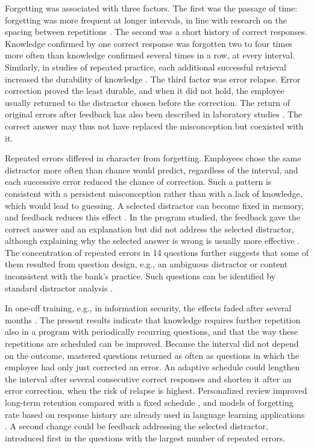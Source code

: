 \documentclass[preprint,12pt,authoryear]{elsarticle}
\begin{document}
Forgetting was associated with three factors. The first was the passage of time: forgetting was more
frequent at longer intervals, in line with research on the spacing between repetitions
\citep{cepeda2006}. The second was a short history of correct responses. Knowledge confirmed by one
correct response was forgotten two to four times more often than knowledge confirmed several times in
a row, at every interval.
Similarly, in studies of repeated practice, each additional successful retrieval increased the
durability of knowledge \citep{rawson2013}. The third factor was error relapse. Error correction proved
the least durable, and when it did not hold, the employee usually returned to the distractor chosen
before the correction. The return of original errors after feedback has also been described in
laboratory studies \citep{butler2011}. The correct answer may thus not have replaced the misconception
but coexisted with it.

Repeated errors differed in character from forgetting. Employees chose the same distractor more often
than chance would predict, regardless of the interval, and each successive error reduced the chance of
correction. Such a pattern is consistent with a persistent misconception rather than with a lack of
knowledge, which would lead to guessing. A selected distractor can become fixed in memory, and feedback
reduces this effect \citep{butler2008}. In the program studied, the feedback gave the correct answer
and an explanation but did not address the selected distractor, although explaining why the selected
answer is wrong is usually more effective \citep{shute2008}. The concentration of repeated errors in
14 questions further suggests that some of them resulted from question design, e.g.,
an ambiguous distractor or content inconsistent with the bank's practice. Such questions can be
identified by standard distractor analysis \citep{gierl2017}.

In one-off training, e.g., in information security, the effects faded after several months
\citep{reinheimer2020}. The present results indicate that knowledge requires further repetition also in
a program with periodically recurring questions, and that the way these repetitions are scheduled can
be improved. Because the interval did not depend on the outcome, mastered questions returned as often
as questions in which the employee had only just corrected an error. An adaptive schedule could
lengthen the interval after several consecutive correct responses and shorten it after an error
correction, when the risk of relapse is highest. Personalized review improved long-term retention
compared with a fixed schedule \citep{lindsey2014}, and models of forgetting rate based on response
history are already used in language learning applications \citep{settles2016}. A second change could
be feedback addressing the selected distractor, introduced first in the questions with the largest
number of repeated errors.
\end{document}
